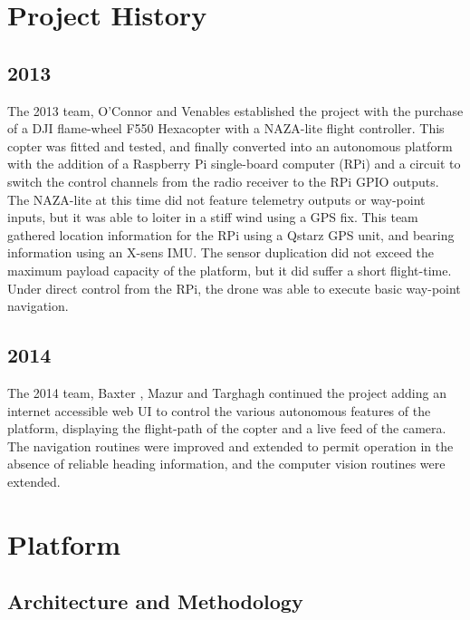 \documentclass{article}
\begin{document}
\section{Project History}

    \subsection{2013}
      The 2013 team, O'Connor \cite{OConnor} and Venables \cite{Venables} established the project with the purchase of a DJI flame-wheel F550 Hexacopter with a NAZA-lite flight controller.  This copter was fitted and tested, and finally converted into an autonomous platform with the addition of a Raspberry Pi single-board computer (RPi) and a circuit to switch the control channels from the radio receiver to the RPi GPIO outputs.
      The NAZA-lite at this time did not feature telemetry outputs or way-point inputs, but it was able to loiter in a stiff wind using a GPS fix.
      This team gathered location information for the RPi using a Qstarz GPS unit, and bearing information using an X-sens IMU.  The sensor duplication did not exceed the maximum payload capacity of the platform, but it did suffer a short flight-time.
      Under direct control from the RPi, the drone was able to execute basic way-point navigation.
    \subsection{2014}

      The 2014 team, Baxter \cite{Baxter}, Mazur \cite{Mazur} and Targhagh \cite{Targhagh} continued the project adding an internet accessible web UI to control the various autonomous features of the platform, displaying the flight-path of the copter and a live feed of the camera.
      The navigation routines were improved and extended to permit operation in the absence of reliable heading information, and the computer vision routines were extended.

  \section{Platform}





  \subsection{Architecture and Methodology}
  
\end{document}
